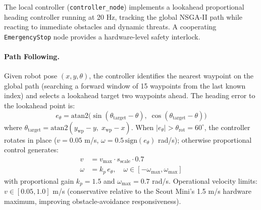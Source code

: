 \documentclass[pdflatex,sn-nature]{sn-jnl}%
\begin{document}
The local controller (\texttt{controller\_node}) implements a lookahead proportional heading controller running at 20 Hz, tracking the global NSGA-II path while reacting to immediate obstacles and dynamic threats. A cooperating \texttt{EmergencyStop} node provides a hardware-level safety interlock.

\paragraph{Path Following.}
Given robot pose $(x, y, \theta)$, the controller identifies the nearest waypoint on the global path (searching a forward window of 15 waypoints from the last known index) and selects a lookahead target two waypoints ahead. The heading error to the lookahead point is:
\begin{equation}
e_\theta = \mathrm{atan2}\bigl(\sin(\theta_{\mathrm{target}} - \theta),\; \cos(\theta_{\mathrm{target}} - \theta)\bigr)
\label{eq:heading_error}
\end{equation}
where $\theta_{\mathrm{target}} = \mathrm{atan2}(y_{\mathrm{wp}} - y,\; x_{\mathrm{wp}} - x)$.
When $|e_\theta| > \theta_{\mathrm{rot}} = 60^\circ$, the controller rotates in place ($v = 0.05$ m/s, $\omega = 0.5\,\mathrm{sign}(e_\theta)$ rad/s); otherwise proportional control generates:
\begin{align}
v   &= v_{\max} \cdot s_{\mathrm{scale}} \cdot 0.7 \label{eq:ctrl_v} \\
\omega &= k_p\,e_\theta, \quad \omega \in [-\omega_{\max}, \omega_{\max}] \label{eq:ctrl_w}
\end{align}
with proportional gain $k_p = 1.5$ and $\omega_{\max} = 0.7$ rad/s. Operational velocity limits: $v \in [0.05, 1.0]$ m/s (conservative relative to the Scout Mini's 1.5 m/s hardware maximum, improving obstacle-avoidance responsiveness).
\end{document}
